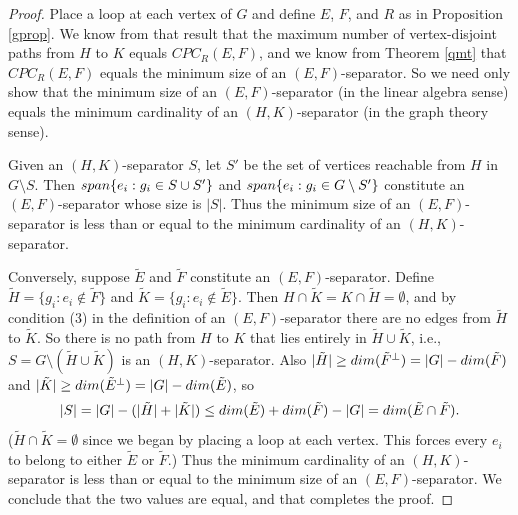 \documentclass[10pt,a4paper]{amsart}
\begin{document}
\begin{proof}
Place a loop at each vertex of $G$ and define $E$, $F$, and $R$ as in Proposition \ref{gprop}. We know from that result that the maximum number of vertex-disjoint paths from $H$ to $K$ equals $CPC_R(E,F)$, and we know from Theorem \ref{qmt} that $CPC_R(E,F)$ equals the minimum size of an $(E,F)$-separator. So we need only show that the minimum size of an $(E,F)$-separator (in the linear algebra sense) equals the minimum cardinality of an $(H,K)$-separator (in the graph theory sense).

Given an $(H,K)$-separator $S$, let $S'$ be the set of vertices reachable from $H$ in $G\setminus S$. Then ${\rm span}\{e_i: g_i \in S \cup S'\}$ and ${\rm span}\{e_i: g_i \in G\setminus S'\}$ constitute an $(E,F)$-separator whose size is $|S|$. Thus the minimum size of an $(E,F)$-separator is less than or equal to the minimum cardinality of an $(H,K)$-separator.

Conversely, suppose $\tilde{E}$ and $\tilde{F}$ constitute an $(E,F)$-separator. Define $\tilde{H} = \{g_i: e_i \not\in \tilde{F}\}$ and $\tilde{K} = \{g_i: e_i \not\in \tilde{E}\}$. Then $H \cap \tilde{K} = K \cap \tilde{H} = \emptyset$, and by condition (3) in the definition of an $(E,F)$-separator there are no edges from $\tilde{H}$ to $\tilde{K}$. So there is no path from $H$ to $K$ that lies entirely in $\tilde{H} \cup \tilde{K}$, i.e., $S = G\setminus (\tilde{H} \cup \tilde{K})$ is an $(H,K)$-separator. Also $|\tilde{H}| \geq {\rm dim}(\tilde{F}^\perp) = |G| - {\rm dim}(\tilde{F})$ and $|\tilde{K}| \geq {\rm dim}(\tilde{E}^\perp) = |G| - {\rm dim}(\tilde{E})$, so $$|S| = |G| - (|\tilde{H}| + |\tilde{K}|)  \leq {\rm dim}(\tilde{E}) + {\rm dim}(\tilde{F}) - |G| = {\rm dim}(\tilde{E} \cap \tilde{F}).$$ ($\tilde{H} \cap \tilde{K} = \emptyset$ since we began by placing a loop at each vertex. This forces every $e_i$ to belong to either $\tilde{E}$ or $\tilde{F}$.) Thus the minimum cardinality of an $(H,K)$-separator is less than or equal to the minimum size of an $(E,F)$-separator. We conclude that the two values are equal, and that completes the proof.
\end{proof}
\end{document}
